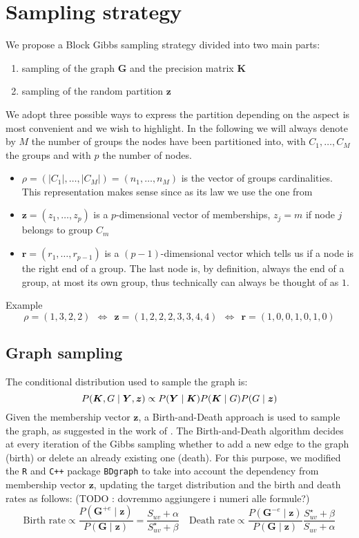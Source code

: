 \section{Sampling strategy}
We propose a Block Gibbs sampling strategy divided into two main parts: 
\begin{enumerate}
    \item sampling of the graph $\bm{G}$ and the precision matrix $\bm{K}$
    \item sampling of the random partition $\bm{z}$
\end{enumerate}
We adopt three possible ways to express the partition depending on the aspect is most convenient and we wish to highlight. In the following we will always denote by $M$ the number of groups the nodes have been partitioned into, with $C_{1}, \dotsc, C_{M}$ the groups and with $p$ the number of nodes.
\begin{itemize}
\item $\rho =( |C_{1}| ,\dotsc ,|C_{M}|) =( n_{1} ,\dotsc ,n_{M})$ is the vector of groups cardinalities. This representation makes sense since as its law we use the one from \parencite{martinezNonparametricChangePoint2014}
\item $\bm{z} =( z_{1} ,\dotsc ,z_{p})$ is a $p$-dimensional vector of memberships, $z_{j} =m$ if node $j$ belongs to group $C_{m}$
\item $\bm{r} =( r_{1} ,\dotsc ,r_{p-1})$ is a $( p-1)$-dimensional vector which tells us if a node is the right end of a group. The last node is, by definition, always the end of a group, at most its own group, thus technically can always be thought of as $1$.
\end{itemize}
Example
\begin{equation*}
\rho =( 1,3,2,2) \ \ \iff \ \ \bm{z} =( 1,2,2,2,3,3,4,4) \ \ \iff \ \ \bm{r} =( 1,0,0,1,0,1,0)
\end{equation*}

\subsection{Graph sampling}
The conditional distribution used to sample the graph is:
$$\small P(\bm{K},G \mid \bm{Y},\bm{z}) \propto P(\bm{Y} \mid \bm{K})P(\bm{K} \mid {G}) P(G \mid \bm{z})$$
Given the membership vector $\bm{z}$, a Birth-and-Death approach is used to sample the graph, as suggested in the work of \parencite{mohammadiBayesianStructureLearning2015a}.
The Birth-and-Death algorithm decides at every iteration of the Gibbs sampling whether to add a new edge to the graph (birth) or delete an already existing one (death).
For this purpose, we modified the \texttt{R} and \texttt{C++} package \texttt{BDgraph} to take into account the dependency from membership vector $\bm{z}$, updating the target distribution and the birth and death rates as follows: (TODO : dovremmo aggiungere i numeri alle formule?)
\[
\text{Birth rate} \propto \frac{P(\bm{G}^{+ e}\mid \bm{z})}{P(\bm{G}\mid \bm{z})} = \frac{S_{uv} + \alpha}{S^{\star}_{uv} + \beta}
\quad
\text{Death rate} \propto \frac{P(\bm{G}^{- e}\mid \bm{z})}{P(\bm{G}\mid \bm{z})} \frac{S^{\star}_{uv} + \beta}{S_{uv} + \alpha}
\]

